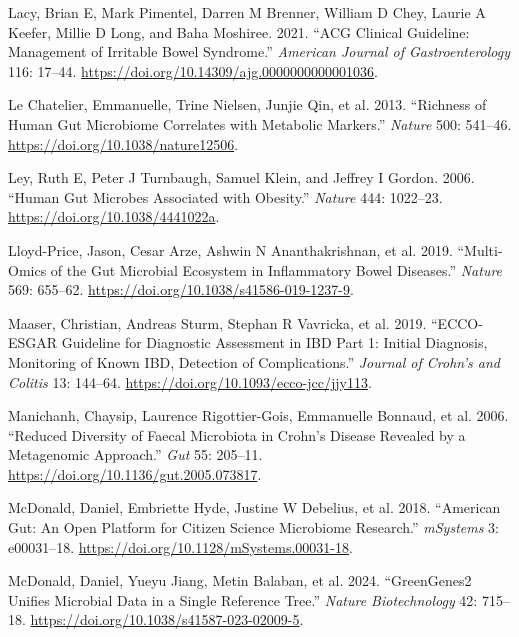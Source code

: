 \documentclass[
  11pt,
]{article}
\newlength{\cslhangindent}
\newenvironment{CSLReferences}[2] %
 {\begin{list}{}{%
  \setlength{\itemindent}{0pt}
  \setlength{\leftmargin}{0pt}
  \setlength{\parsep}{0pt}
  \ifodd #1
   \setlength{\leftmargin}{\cslhangindent}
   \setlength{\itemindent}{-1\cslhangindent}
  \fi
  \setlength{\itemsep}{#2\baselineskip}}}
 {\end{list}}
\begin{document}
\begin{CSLReferences}{1}{0}
Lacy, Brian E, Mark Pimentel, Darren M Brenner, William D Chey, Laurie A
Keefer, Millie D Long, and Baha Moshiree. 2021. {``{ACG} Clinical
Guideline: Management of Irritable Bowel Syndrome.''} \emph{American
Journal of Gastroenterology} 116: 17--44.
\url{https://doi.org/10.14309/ajg.0000000000001036}.

Le Chatelier, Emmanuelle, Trine Nielsen, Junjie Qin, et al. 2013.
{``Richness of Human Gut Microbiome Correlates with Metabolic
Markers.''} \emph{Nature} 500: 541--46.
\url{https://doi.org/10.1038/nature12506}.

Ley, Ruth E, Peter J Turnbaugh, Samuel Klein, and Jeffrey I Gordon.
2006. {``Human Gut Microbes Associated with Obesity.''} \emph{Nature}
444: 1022--23. \url{https://doi.org/10.1038/4441022a}.

Lloyd-Price, Jason, Cesar Arze, Ashwin N Ananthakrishnan, et al. 2019.
{``Multi-Omics of the Gut Microbial Ecosystem in Inflammatory Bowel
Diseases.''} \emph{Nature} 569: 655--62.
\url{https://doi.org/10.1038/s41586-019-1237-9}.

Maaser, Christian, Andreas Sturm, Stephan R Vavricka, et al. 2019.
{``{ECCO-ESGAR} Guideline for Diagnostic Assessment in {IBD} Part 1:
Initial Diagnosis, Monitoring of Known {IBD}, Detection of
Complications.''} \emph{Journal of Crohn's and Colitis} 13: 144--64.
\url{https://doi.org/10.1093/ecco-jcc/jjy113}.

Manichanh, Chaysip, Laurence Rigottier-Gois, Emmanuelle Bonnaud, et al.
2006. {``Reduced Diversity of Faecal Microbiota in {C}rohn's Disease
Revealed by a Metagenomic Approach.''} \emph{Gut} 55: 205--11.
\url{https://doi.org/10.1136/gut.2005.073817}.

McDonald, Daniel, Embriette Hyde, Justine W Debelius, et al. 2018.
{``{A}merican {G}ut: An Open Platform for Citizen Science Microbiome
Research.''} \emph{mSystems} 3: e00031--18.
\url{https://doi.org/10.1128/mSystems.00031-18}.

McDonald, Daniel, Yueyu Jiang, Metin Balaban, et al. 2024.
{``{G}reen{G}enes2 Unifies Microbial Data in a Single Reference Tree.''}
\emph{Nature Biotechnology} 42: 715--18.
\url{https://doi.org/10.1038/s41587-023-02009-5}.


\end{CSLReferences}
\end{document}
